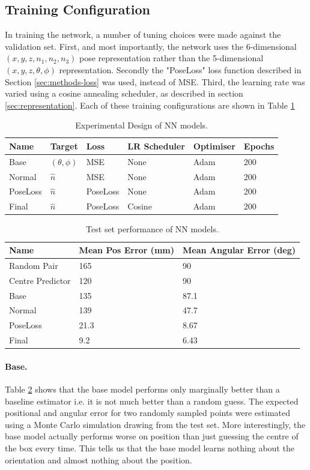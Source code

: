 \subsection{Training Configuration}
In training the network, a number of tuning choices were made against the validation set. First, and most importantly, the network uses the 6-dimensional $(x,y,z,n_1,n_2,n_3)$ pose representation rather than the 5-dimensional $(x,y,z,\theta,\phi)$ representation. Secondly the "PoseLoss" loss function described in Section \ref{sec:methods-loss} was used, instead of MSE. Third, the learning rate was varied using a cosine annealing scheduler, as described in section \ref{sec:representation}. Each of these training configurations are shown in  Table \ref{tab:training_config} 
\begin{table}
  \centering
  \begin{tabular}{llllll}
    \toprule
    Name & Target & Loss & LR Scheduler & Optimiser & Epochs\\
    \midrule
    Base & $(\theta,\phi)$ & MSE & None & Adam & 200  \\
    Normal & $\hat{n}$ & MSE & None & Adam & 200\\
    PoseLoss & $\hat{n}$ & PoseLoss & None & Adam & 200 \\
    Final & $\hat{n}$ & PoseLoss & Cosine & Adam & 200 \\
    \bottomrule
  \end{tabular}
  \caption{Experimental Design of NN models.}
  \label{tab:training_config}
\end{table}
\begin{table}
  \centering
  \begin{tabular}{lll}
    \toprule
    Name & Mean Pos Error (mm) & Mean Angular Error (deg)  \\
    \midrule
    Random Pair & 165 & 90 \\
    Centre Predictor & 120 & 90 \\
    Base & 135 & 87.1  \\
    Normal & 139 & 47.7 \\
    PoseLoss & 21.3 & 8.67 \\
    Final & 9.2 & 6.43 \\
    \bottomrule
  \end{tabular}
  \caption{Test set performance of NN models.}
  \label{tab:nn_results}
\end{table}

\paragraph{Base.}Table \ref{tab:nn_results} shows that the base model performs only marginally better than a baseline estimator i.e. it is not much better than a random guess. The expected positional and angular error for two randomly sampled points were estimated using a Monte Carlo simulation drawing from the test set. More interestingly, the base model actually performs worse on position than just guessing the centre of the box every time. This tells us that the base model learns nothing about the orientation and almost nothing about the position.


